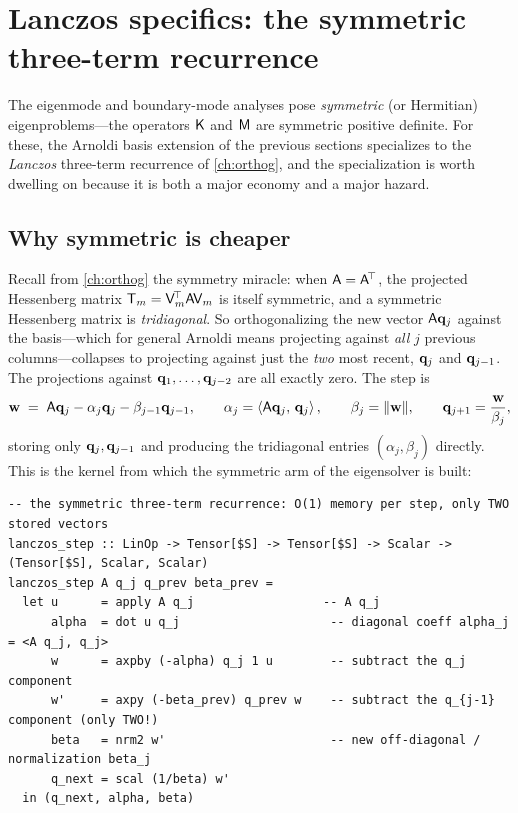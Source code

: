 \section{Lanczos specifics: the symmetric three-term recurrence}
\label{sec:lanczosspecific}

The eigenmode and boundary-mode analyses pose \emph{symmetric} (or Hermitian) eigenproblems---the
operators $\mathsf{K}$ and $\mathsf{M}$ are symmetric positive definite. For these, the Arnoldi basis
extension of the previous sections specializes to the \emph{Lanczos} three-term recurrence of
\cref{ch:orthog}, and the specialization is worth dwelling on because it is both a major economy
and a major hazard.

\subsection{Why symmetric is cheaper}

Recall from \cref{ch:orthog} the symmetry miracle: when $\mathsf{A} = \mathsf{A}^{\!\top}$, the projected
Hessenberg matrix $\mathsf{T}_m = \mathsf{V}_m^{\!\top}\mathsf{A}\mathsf{V}_m$ is itself symmetric, and a
symmetric Hessenberg matrix is \emph{tridiagonal}. So orthogonalizing the new vector
$\mathsf{A}\mathbf{q}_j$ against the basis---which for general Arnoldi means projecting against \emph{all}
$j$ previous columns---collapses to projecting against just the \emph{two} most recent,
$\mathbf{q}_j$ and $\mathbf{q}_{j-1}$. The projections against $\mathbf{q}_1, \dots, \mathbf{q}_{j-2}$ are all exactly zero.
The step is
\[
  \mathbf{w} \;=\; \mathsf{A}\mathbf{q}_j - \alpha_j\mathbf{q}_j - \beta_{j-1}\mathbf{q}_{j-1},
  \qquad
  \alpha_j = \left\langle \mathsf{A}\mathbf{q}_j,\, \mathbf{q}_j\right\rangle,
  \qquad
  \beta_j = \lVert\mathbf{w}\rVert,
  \qquad
  \mathbf{q}_{j+1} = \frac{\mathbf{w}}{\beta_j},
\]
storing only $\mathbf{q}_j, \mathbf{q}_{j-1}$ and producing the tridiagonal entries $(\alpha_j, \beta_j)$
directly. This is the  kernel from which the symmetric arm of the eigensolver
is built:

\begin{lstlisting}[style=l4style]
-- the symmetric three-term recurrence: O(1) memory per step, only TWO stored vectors
lanczos_step :: LinOp -> Tensor[$S] -> Tensor[$S] -> Scalar -> (Tensor[$S], Scalar, Scalar)
lanczos_step A q_j q_prev beta_prev =
  let u      = apply A q_j                  -- A q_j
      alpha  = dot u q_j                     -- diagonal coeff alpha_j = <A q_j, q_j>
      w      = axpby (-alpha) q_j 1 u        -- subtract the q_j component
      w'     = axpy (-beta_prev) q_prev w    -- subtract the q_{j-1} component (only TWO!)
      beta   = nrm2 w'                       -- new off-diagonal / normalization beta_j
      q_next = scal (1/beta) w'
  in (q_next, alpha, beta)
\end{lstlisting}


